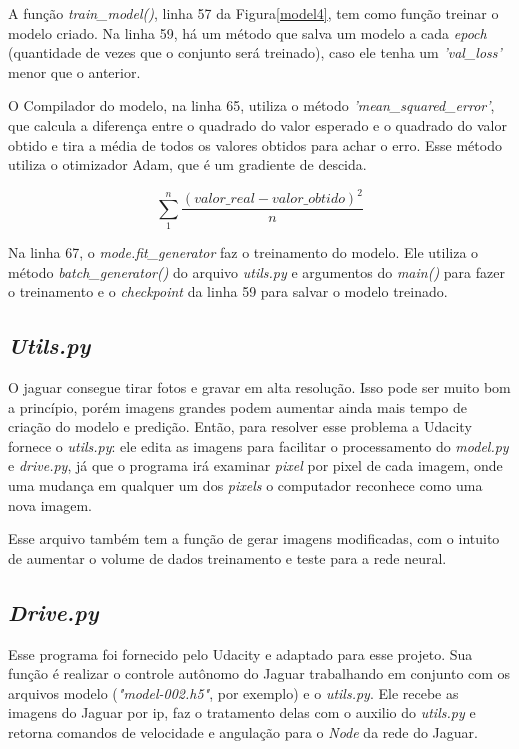 A função \textit{train\_model()}, linha 57 da Figura\ref{model4}, tem como função treinar o modelo criado. Na linha 59, há um método que salva um modelo a cada \textit{epoch} (quantidade de vezes que o conjunto será treinado), caso ele tenha um \textit{'val\_loss'} menor que o anterior.

O Compilador do modelo, na linha 65, utiliza o método \textit{'mean\_squared\_error'}, que calcula a diferença entre o quadrado do valor esperado e o quadrado do valor obtido e tira a média de todos os valores obtidos para achar o erro. Esse método utiliza o otimizador Adam, que é um gradiente de descida.

\[\sum_{1}^{n}\frac{(valor\_real - valor\_obtido)^{2}}{n}\]

Na linha 67, o \textit{mode.fit\_generator} faz o treinamento do modelo. Ele utiliza o método \textit{batch\_generator()} do arquivo \textit{utils.py} e argumentos do \textit{main()} para fazer o treinamento e o \textit{checkpoint} da linha 59 para salvar o modelo treinado.


\subsection{\textit{Utils.py}}

 O jaguar consegue tirar fotos e gravar em alta resolução. Isso pode ser muito bom a princípio, porém imagens grandes podem aumentar ainda mais tempo de criação do modelo e predição. Então, para resolver esse problema a Udacity fornece o \textit{utils.py}: ele edita as imagens para facilitar o processamento do \textit{model.py} e \textit{drive.py}, já que o programa irá examinar \textit{pixel} por pixel de cada imagem, onde uma mudança em qualquer um dos \textit{pixels} o computador reconhece como uma nova imagem.

Esse arquivo também tem a função de gerar imagens modificadas, com o intuito de aumentar o volume de dados treinamento e teste para a rede neural.

\subsection{\textit{Drive.py}}
\label{sec:drive.py}

Esse programa foi fornecido pelo Udacity e adaptado para esse projeto. Sua função é realizar o controle autônomo do Jaguar trabalhando em conjunto com os arquivos modelo (\textit{"model-002.h5"}, por exemplo) e o \textit{utils.py}. Ele recebe as imagens do Jaguar por ip, faz o tratamento delas com o auxilio do \textit{utils.py} e retorna comandos de velocidade e angulação para o \textit{Node} da rede do Jaguar. 

